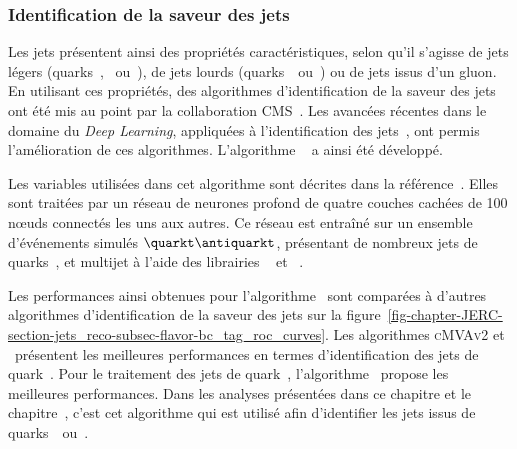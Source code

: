 \subsubsection{Identification de la saveur des jets}
Les jets présentent ainsi des propriétés caractéristiques, selon qu'il s'agisse de jets légers (quarks~\quarkd, \quarku\ ou~\quarks), de jets lourds (quarks~\quarkc\ ou~\quarkb) ou de jets issus d'un gluon.
En utilisant ces propriétés, des algorithmes d'identification de la saveur des jets ont été mis au point par la collaboration CMS~\cite{jet_btag_CSV_RunI}.
Les avancées récentes dans le domaine du \emph{Deep Learning}, appliquées à l'identification des jets~\cite{jet_flavor_deep_nn}, ont permis l'amélioration de ces algorithmes. L'algorithme \DeepCSV~\cite{Sirunyan_heavy_flavor_jets_2018} a ainsi été développé.
\par Les variables utilisées dans cet algorithme sont décrites dans la référence~\cite{Sirunyan_heavy_flavor_jets_2018}.
Elles sont traitées par un réseau de neurones profond de quatre couches cachées de 100 nœuds connectés les uns aux autres.
Ce réseau est entraîné sur un ensemble d'événements simulés $\quarkt\antiquarkt$, présentant de nombreux jets de quarks~\quarkb, et multijet à l'aide des librairies
\KERAS~\cite{keras}
et
\TENSORFLOW~\cite{tensorflow}.
\par Les performances ainsi obtenues pour l'algorithme \DeepCSV\ sont comparées à d'autres algorithmes d'identification de la saveur des jets sur la figure~\ref{fig-chapter-JERC-section-jets_reco-subsec-flavor-bc_tag_roc_curves}.
Les algorithmes \textsc{cMVAv2} et \DeepCSV\ présentent les meilleures performances en termes d'identification des jets de quark~\quarkb.
Pour le traitement des jets de quark~\quarkc, l'algorithme \DeepCSV\ propose les meilleures performances.
Dans les analyses présentées dans ce chapitre et le chapitre~, c'est cet algorithme qui est utilisé afin d'identifier les jets issus de quarks~\quarkc\ ou~\quarkb.
